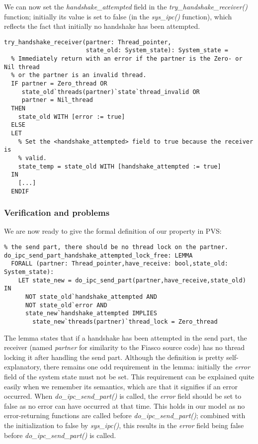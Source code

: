 We can now set the \emph{handshake\_attempted} field in the \emph{try\_handshake\_receiver()} function; initially its value is set to false (in the \emph{sys\_ipc()} function), which reflects the fact that initially no handshake has been attempted.

\lstset{language=PVS}
\begin{lstlisting}[caption={PVS: setting the \emph{handshake} field.}]
try_handshake_receiver(partner: Thread_pointer, 
                       state_old: System_state): System_state =
  % Immediately return with an error if the partner is the Zero- or Nil thread
  % or the partner is an invalid thread.
  IF partner = Zero_thread OR
     state_old`threads(partner)`state`thread_invalid OR 
     partner = Nil_thread
  THEN
    state_old WITH [error := true]
  ELSE
  LET 
    % Set the <handshake_attempted> field to true because the receiver is 
    % valid.
    state_temp = state_old WITH [handshake_attempted := true] 
  IN
    [...]
  ENDIF
\end{lstlisting}

\subsubsection{Verification and problems}
We are now ready to give the formal definition of our property in PVS:

\lstset{language=PVS}
\begin{lstlisting}[caption={PVS: property 1, formal definition.}]
% If a handshake has been attempted, that should imply that after finishing 
% the send part, there should be no thread lock on the partner.
do_ipc_send_part_handshake_attempted_lock_free: LEMMA
  FORALL (partner: Thread_pointer,have_receive: bool,state_old: System_state):
    LET state_new = do_ipc_send_part(partner,have_receive,state_old) IN
      NOT state_old`handshake_attempted AND 
      NOT state_old`error AND
      state_new`handshake_attempted IMPLIES
        state_new`threads(partner)`thread_lock = Zero_thread
\end{lstlisting}

The lemma states that if a handshake has been attempted in the send part, the receiver (named \emph{partner} for similarity to the Fiasco source code) has no thread locking it after handling the send part. Although the definition is pretty self-explanatory, there remains one odd requirement in the lemma: initially the \emph{error} field of the system state must not be set. This requirement can be explained quite easily when we remember its semantics, which are that it signifies if an error occurred. When \emph{do\_ipc\_send\_part()} is called, the \emph{error} field should be set to false as no error can have occurred at that time. This holds in our model as no error-returning functions are called before \emph{do\_ipc\_send\_part()}; combined with the initialization to false by \emph{sys\_ipc()}, this results in the \emph{error} field being false before \emph{do\_ipc\_send\_part()} is called.\emptyline

